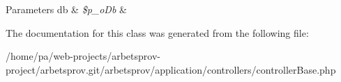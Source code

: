\begin{DoxyParams}[1]{Parameters}
db & {\em \$p\-\_\-o\-Db} & \\
\hline
\end{DoxyParams}


The documentation for this class was generated from the following file\-:\begin{DoxyCompactItemize}
\item 
/home/pa/web-\/projects/arbetsprov-\/project/arbetsprov.\-git/arbetsprov/application/controllers/controller\-Base.\-php\end{DoxyCompactItemize}
